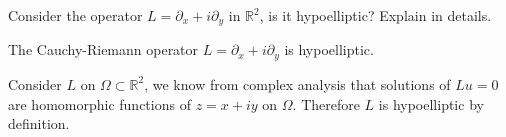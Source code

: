 \begin{pro}
  Consider the operator $L=\partial_x+i\partial_y$ in $\mathbb{R}^2$,
  is it hypoelliptic?
  Explain in details.
\end{pro}
\begin{sol}
  The Cauchy-Riemann operator $L=\partial_x+i\partial_y$ is hypoelliptic.

  Consider $L$ on $\Omega\subset\mathbb{R}^2$,
  we know from complex analysis that solutions of $Lu=0$
  are homomorphic functions of $z=x+iy$ on $\Omega$.
  Therefore $L$ is hypoelliptic by definition.





\end{sol}
